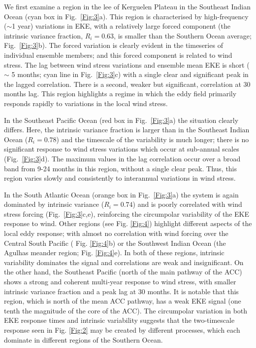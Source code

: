 \documentclass[linenumbers]{agujournal2019}
\begin{document}
We first examine a region in the lee of Kerguelen Plateau in the Southeast Indian Ocean (cyan box in Fig.~\ref{Fig:3}a).
This region is characterised by high-frequency ($\sim$1 year) variations in EKE, with a relatively large forced component (the intrinsic variance fraction, $R_i = 0.63$, is smaller than the Southern Ocean average; Fig.~\ref{Fig:3}b).
The forced variation is clearly evident in the timeseries of  individual ensemble members; and this forced component is related to wind stress.
The lag between wind stress variations and ensemble mean EKE is short ($\sim$ 5 months; cyan line in Fig.~\ref{Fig:3}c) with a single clear  and significant peak in the lagged correlation.
There is a second, weaker but significant, correlation at 30 months lag.
This region highlights a regime in which the eddy field primarily responds rapidly to variations in the local wind stress.

In the Southeast Pacific Ocean (red box in Fig.~\ref{Fig:3}a) the situation clearly differs.
Here, the intrinsic variance fraction is larger than in the Southeast Indian Ocean ($R_i=0.78$) and the timescale of the variability is much longer; there is no significant response to wind stress variations which occur at sub-annual scales (Fig.~\ref{Fig:3}d).
The maximum values in the lag correlation occur over a broad band from 9-24 months in this region, without a single clear peak.
Thus, this region varies slowly and consistently to interannual variations in wind stress.

In the South Atlantic Ocean (orange box in Fig.~\ref{Fig:3}a) the system is again dominated by intrinsic variance ($R_i=0.74$) and is poorly correlated with wind stress forcing (Fig.~\ref{Fig:3}c,e), reinforcing the circumpolar variability of the EKE response to wind.
Other regions (see Fig. \ref{Fig:4}) highlight different aspects of the local eddy response;  with almost no correlation with wind forcing over the Central South Pacific ( Fig. \ref{Fig:4}b) or the Southwest Indian Ocean  (the Agulhas meander region; Fig. \ref{Fig:4}e).
In both of these regions, intrinsic variability dominates the signal and correlations are weak and insignificant. 
On the other hand, the Southeast Pacific (north of the main pathway of the ACC) shows a strong and coherent multi-year response to wind stress, with smaller intrinsic variance fraction and a peak lag at 30 months.
It is notable that this region, which is north of the mean ACC pathway, has a weak EKE signal (one tenth the magnitude of the core of the ACC).
The circumpolar variation in both EKE response times and intrinsic variability suggests that the two-timescale response seen in Fig. \ref{Fig:2} may be created by different processes, which each dominate in different regions of the Southern Ocean.
\end{document}
